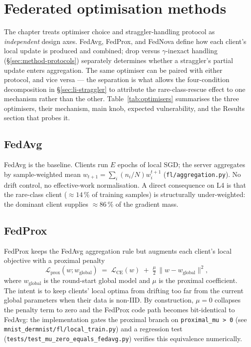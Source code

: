 \documentclass[11pt,a4paper]{report}
\begin{document}
\section{Federated optimisation methods}
\label{sec:method-optimisers}

The chapter treats optimiser choice and straggler-handling protocol as
\emph{independent} design axes. FedAvg, FedProx, and FedNova define how
each client's local update is produced and combined; drop versus
$\gamma$-inexact handling (§\ref{sec:method-protocols}) separately
determines whether a straggler's partial update enters aggregation. The
same optimiser can be paired with either protocol, and vice versa ---
the separation is what allows the four-condition decomposition in
§\ref{sec:li-straggler} to attribute the rare-class-rescue effect to
one mechanism rather than the other. Table~\ref{tab:optimisers}
summarises the three optimisers, their mechanism, main knob, expected
vulnerability, and the Results section that probes it.

\subsection{FedAvg}

FedAvg \citep{mcmahan2017fedavg} is the baseline. Clients run $E$
epochs of local SGD; the server aggregates by sample-weighted mean
$w_{t+1} = \sum_i (n_i / N) w_i^{t+1}$ (\texttt{fl/aggregation.py}).
No drift control, no effective-work normalisation. A direct consequence
on L4 is that the rare-class client ($\approx 14\,\%$ of training
samples) is structurally under-weighted: the dominant client supplies
$\approx 86\,\%$ of the gradient mass.

\subsection{FedProx}

FedProx \citep{li2020fedprox} keeps the FedAvg aggregation rule but
augments each client's local objective with a proximal penalty
\[
  \mathcal{L}_{\textrm{prox}}(w; w_{\textrm{global}})
  \;=\; \mathcal{L}_{\textrm{CE}}(w) \;+\; \tfrac{\mu}{2}\,
        \lVert w - w_{\textrm{global}} \rVert^{2},
\]
where $w_{\textrm{global}}$ is the round-start global model and $\mu$ is
the proximal coefficient. The intent is to keep clients' local optima
from drifting too far from the current global parameters when their
data is non-IID. By construction, $\mu = 0$ collapses the penalty term
to zero and the FedProx code path becomes bit-identical to FedAvg: the
implementation gates the proximal branch on \texttt{proximal\_mu > 0}
(see \texttt{mnist\_dermnist/fl/local\_train.py}) and a regression test
(\texttt{tests/test\_mu\_zero\_equals\_fedavg.py}) verifies this
equivalence numerically.
\end{document}
